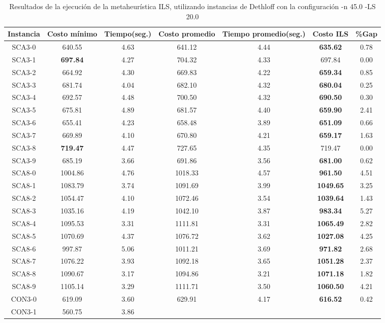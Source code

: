 \begin{table}[ht]
\caption{Resultados de la ejecución de la metaheurística ILS, utilizando instancias de Dethloff con la configuración -n 45.0 -LS 20.0}
\centering
\small
\begin{tabular}{c c c c c c c}
\hline\hline
Instancia & Costo mínimo & Tiempo(seg.) & Costo promedio & Tiempo promedio(seg.) & Costo ILS & \%Gap \\ [0.5ex]
\hline
SCA3-0 & 640.55 & 4.63 & 
641.12 & 4.44 & \bf{635.62} & 
0.78\\SCA3-1 & \bf{697.84} & 4.27 & 
704.32 & 4.33 & 697.84 & 0.00\\
SCA3-2 & 664.92 & 4.30 & 
669.83 & 4.22 & \bf{659.34} & 
0.85\\SCA3-3 & 681.74 & 4.04 & 
682.10 & 4.32 & \bf{680.04} & 
0.25\\SCA3-4 & 692.57 & 4.48 & 
700.50 & 4.32 & \bf{690.50} & 
0.30\\SCA3-5 & 675.81 & 4.89 & 
681.57 & 4.40 & \bf{659.90} & 
2.41\\SCA3-6 & 655.41 & 4.23 & 
658.48 & 3.89 & \bf{651.09} & 
0.66\\SCA3-7 & 669.89 & 4.10 & 
670.80 & 4.21 & \bf{659.17} & 
1.63\\SCA3-8 & \bf{719.47} & 4.47 & 
727.65 & 4.35 & 719.47 & 0.00\\
SCA3-9 & 685.19 & 3.66 & 
691.86 & 3.56 & \bf{681.00} & 
0.62\\SCA8-0 & 1004.86 & 4.76 & 
1018.33 & 4.57 & \bf{961.50} & 
4.51\\SCA8-1 & 1083.79 & 3.74 & 
1091.69 & 3.99 & \bf{1049.65} & 
3.25\\SCA8-2 & 1054.47 & 4.10 & 
1072.46 & 3.54 & \bf{1039.64} & 
1.43\\SCA8-3 & 1035.16 & 4.19 & 
1042.10 & 3.87 & \bf{983.34} & 
5.27\\SCA8-4 & 1095.53 & 3.31 & 
1111.81 & 3.31 & \bf{1065.49} & 
2.82\\SCA8-5 & 1070.69 & 4.37 & 
1076.72 & 3.62 & \bf{1027.08} & 
4.25\\SCA8-6 & 997.87 & 5.06 & 
1011.21 & 3.69 & \bf{971.82} & 
2.68\\SCA8-7 & 1076.22 & 3.93 & 
1092.18 & 3.65 & \bf{1051.28} & 
2.37\\SCA8-8 & 1090.67 & 3.17 & 
1094.86 & 3.21 & \bf{1071.18} & 
1.82\\SCA8-9 & 1105.14 & 3.29 & 
1111.71 & 3.50 & \bf{1060.50} & 
4.21\\CON3-0 & 619.09 & 3.60 & 
629.91 & 4.17 & \bf{616.52} & 
0.42\\CON3-1 & 560.75 & 3.86 & 

\end{tabular}
\end{table}
